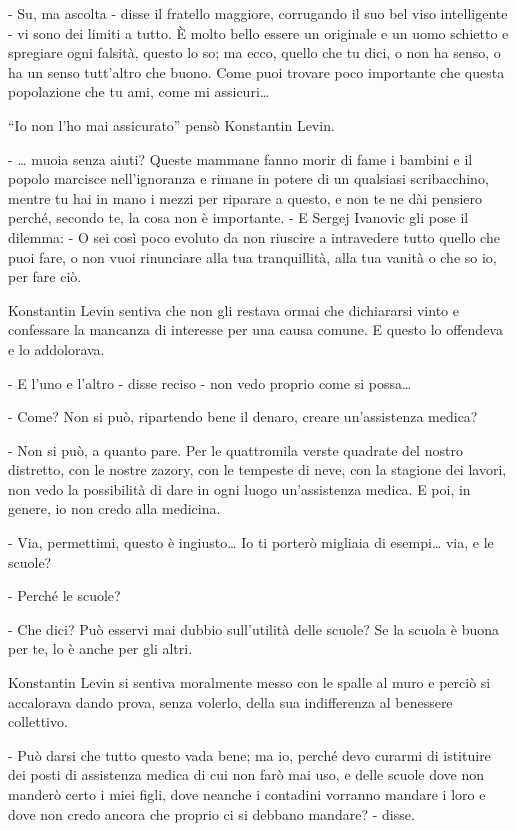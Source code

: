 - Su, ma ascolta - disse il fratello maggiore, corrugando il suo bel viso intelligente - vi sono dei limiti a tutto. È molto bello essere un originale e un uomo schietto e spregiare ogni falsità, questo lo so; ma ecco, quello che tu dici, o non ha senso, o ha un senso tutt'altro che buono. Come puoi trovare poco importante che questa popolazione che tu ami, come mi assicuri\ldots{} 

``Io non l'ho mai assicurato'' pensò Konstantin Levin. 

- \ldots{} muoia senza aiuti? Queste mammane fanno morir di fame i bambini e il popolo marcisce nell'ignoranza e rimane in potere di un qualsiasi scribacchino, mentre tu hai in mano i mezzi per riparare a questo, e non te ne dài pensiero perché, secondo te, la cosa non è importante. - E Sergej Ivanovic gli pose il dilemma: - O sei così poco evoluto da non riuscire a intravedere tutto quello che puoi fare, o non vuoi rinunciare alla tua tranquillità, alla tua vanità o che so io, per fare ciò. 

Konstantin Levin sentiva che non gli restava ormai che dichiararsi vinto e confessare la mancanza di interesse per una causa comune. E questo lo offendeva e lo addolorava. 

- E l'uno e l'altro - disse reciso - non vedo proprio come si possa\ldots{} 

- Come? Non si può, ripartendo bene il denaro, creare un'assistenza medica? 

- Non si può, a quanto pare. Per le quattromila verste quadrate del nostro distretto, con le nostre zazory, con le tempeste di neve, con la stagione dei lavori, non vedo la possibilità di dare in ogni luogo un'assistenza medica. E poi, in genere, io non credo alla medicina. 

- Via, permettimi, questo è ingiusto\ldots{} Io ti porterò migliaia di esempi\ldots{} via, e le scuole? 

- Perché le scuole? 

- Che dici? Può esservi mai dubbio sull'utilità delle scuole? Se la scuola è buona per te, lo è anche per gli altri. 

Konstantin Levin si sentiva moralmente messo con le spalle al muro e perciò si accalorava dando prova, senza volerlo, della sua indifferenza al benessere collettivo. 

- Può darsi che tutto questo vada bene; ma io, perché devo curarmi di istituire dei posti di assistenza medica di cui non farò mai uso, e delle scuole dove non manderò certo i miei figli, dove neanche i contadini vorranno mandare i loro e dove non credo ancora che proprio ci si debbano mandare? - disse. 

